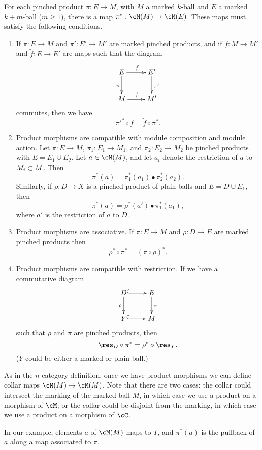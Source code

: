 \begin{module-axiom}
For each pinched product $\pi:E\to M$, with $M$ a marked $k$-ball and $E$ a marked
$k{+}m$-ball ($m\ge 1$),
there is a map $\pi^*:\cM(M)\to \cM(E)$.
These maps must satisfy the following conditions.
\begin{enumerate}
\item
If $\pi:E\to M$ and $\pi':E'\to M'$ are marked pinched products, and
if $f:M\to M'$ and $\tilde{f}:E \to E'$ are maps such that the diagram
\[ \xymatrix{
	E \ar[r]^{\tilde{f}} \ar[d]_{\pi} & E' \ar[d]^{\pi'} \\
	M \ar[r]^{f} & M'
} \]
commutes, then we have 
\[
	\pi'^*\circ f = \tilde{f}\circ \pi^*.
\]
\item
Product morphisms are compatible with module composition and module action.
Let $\pi:E\to M$, $\pi_1:E_1\to M_1$, and $\pi_2:E_2\to M_2$ 
be pinched products with $E = E_1\cup E_2$.
Let $a\in \cM(M)$, and let $a_i$ denote the restriction of $a$ to $M_i\subset M$.
Then 
\[
	\pi^*(a) = \pi_1^*(a_1)\bullet \pi_2^*(a_2) .
\]
Similarly, if $\rho:D\to X$ is a pinched product of plain balls and
$E = D\cup E_1$, then
\[
	\pi^*(a) = \rho^*(a')\bullet \pi_1^*(a_1),
\]
where $a'$ is the restriction of $a$ to $D$.
\item
Product morphisms are associative.
If $\pi:E\to M$ and $\rho:D\to E$ are marked pinched products then
\[
	\rho^*\circ\pi^* = (\pi\circ\rho)^* .
\]
\item
Product morphisms are compatible with restriction.
If we have a commutative diagram
\[ \xymatrix{
	D \ar@{^(->}[r] \ar[d]_{\rho} & E \ar[d]^{\pi} \\
	Y \ar@{^(->}[r] & M
} \]
such that $\rho$ and $\pi$ are pinched products, then
\[
	\res_D\circ\pi^* = \rho^*\circ\res_Y .
\]
($Y$ could be either a marked or plain ball.)
\end{enumerate}
\end{module-axiom}

As in the $n$-category definition, once we have product morphisms we can define
collar maps $\cM(M)\to \cM(M)$.
Note that there are two cases:
the collar could intersect the marking of the marked ball $M$, in which case
we use a product on a morphism of $\cM$; or the collar could be disjoint from the marking,
in which case we use a product on a morphism of $\cC$.

In our example, elements $a$ of $\cM(M)$ maps to $T$, and $\pi^*(a)$ is the pullback of
$a$ along a map associated to $\pi$.

